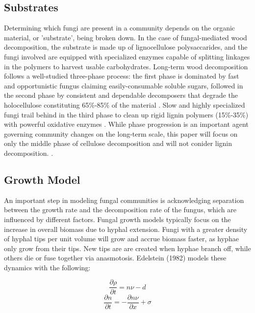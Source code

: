 \documentclass[12pt]{article}
\begin{document}
\begin{multicols}{2}
\subsection{Substrates}
Determining which fungi are present in a community depends on the organic material, or 'substrate', being broken down. In the case of fungal-mediated wood decomposition, the substrate is made up of lignocellulose polysaccarides, and the fungi involved are equipped with specialized enzymes capable of splitting linkages in the polymers to harvest usable carbohydrates. Long-term wood decomposition follows a well-studied three-phase process: the first phase is dominated by fast and opportunistic fungus claiming easily-consumable soluble sugars, followed in the second phase by consistent and dependable decomposers that degrade the holocellulose constituting 65\%-85\% of the material \cite{Segato2014}. Slow and highly specialized fungi trail behind in the third phase to clean up rigid lignin polymers (15\%-35\%) with powerful oxidative enzymes \cite{Moorhead2006}. While phase progression is an important agent governing community changes on the long-term scale, this paper will focus on only the middle phase of cellulose decomposition and will not conider lignin decomposition. \cite{Lustenhouwer2020}.

\subsection{Growth Model}
An important step in modeling fungal communities is acknowledging separation between the growth rate and the decomposition rate of the fungus, which are influenced by different factors. Fungal growth models typically focus on the increase in overall biomass due to hyphal extension. Fungi with a greater density of hyphal tips per unit volume will grow and accrue biomass faster, as hyphae only grow from their tips. New tips are are created when hyphae branch off, while others die or fuse together via anasmotosis. Edelstein (1982) models these dynamics with the following:

\begin{equation} \label{eq:1}
\frac{\partial \rho}{\partial t} = n\nu - d
\end{equation}
\begin{equation} \label{eq:2}
\frac{\partial n}{\partial t} = -\frac{\partial n\nu}{\partial x} + \sigma
\end{equation}


\end{multicols}
\end{document}

